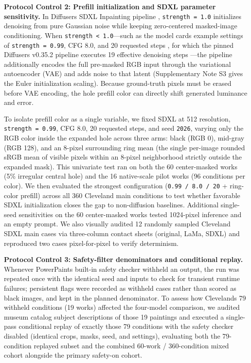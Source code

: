 \documentclass[applsci,article,submit,pdftex,moreauthors]{Definitions/mdpi}
\begin{document}
\textbf{Protocol Control 2: Prefill initialization and SDXL parameter sensitivity.} In Diffusers\textquotesingle{} SDXL Inpainting pipeline \citep{diffuserssdxl0352}, \texttt{strength\ =\ 1.0} initializes denoising from pure Gaussian noise while keeping zero-centered masked-image conditioning. When \texttt{strength\ \textless{}\ 1.0}---such as the model card\textquotesingle s example settings of \texttt{strength\ =\ 0.99}, CFG 8.0, and 20 requested steps \citep{sdxlinpaint}, for which the pinned Diffusers v0.35.2 pipeline executes 19 effective denoising steps \citep{diffuserssdxl0352}---the pipeline additionally encodes the full pre-masked RGB input through the variational autoencoder (VAE) and adds noise to that latent (Supplementary Note S3 gives the Euler initialization scaling). Because ground-truth pixels must be erased before VAE encoding, the hole prefill color can directly shift generated luminance and error.

To isolate prefill color as a single variable, we fixed SDXL at 512 resolution, \texttt{strength\ =\ 0.99}, CFG 8.0, 20 requested steps, and seed \texttt{2026}, varying only the RGB color inside the expanded hole across three arms: black (RGB 0), mid-gray (RGB 128), and an 8-pixel surrounding ring mean (the single per-image rounded sRGB mean of visible pixels within an 8-pixel neighborhood strictly outside the expanded mask). This univariate test ran on both the 60 center-masked works (5\% irregular central hole) and the 16 native-scale pilot works (96 conditions per color). We then evaluated the strongest configuration (\texttt{0.99\ /\ 8.0\ /\ 20} + ring-color prefill) across all 360 Cleveland main conditions to test whether favorable SDXL initialization closes the gap to non-diffusion baselines. Additional single-seed sensitivities on the 60 center-masked works tested 1024-pixel inference and an empty prompt. We also visually audited 12 randomly sampled Cleveland SDXL main cases via three-column contact sheets (original, LaMa, SDXL) and reproduced two cases pixel-for-pixel to verify determinism.

\textbf{Protocol Control 3: Safety-filter denominators and conditional replay.} Whenever PowerPaint\textquotesingle s built-in safety checker withheld an output, the run was repeated once with the identical seed and inputs to check for transient runtime failures; persistent flags were recorded as withheld cases rather than scored as black images, and kept in the planned denominator. To assess how Cleveland\textquotesingle s 79 withheld conditions (19 works) affected the four-model comparison, we audited museum catalog subject descriptions of those 19 paintings and executed a single-pass conditional replay of exactly those 79 conditions with the safety checker disabled (identical crops, masks, seed, and settings), evaluating both the 79-condition replayed subset and the combined 60-work / 360-condition mixed cohort alongside the primary safety-on cohort.
\end{document}
